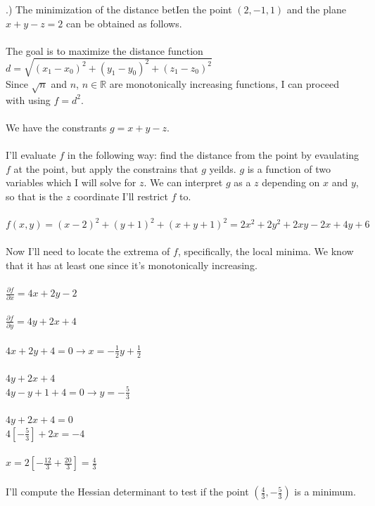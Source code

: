 \documentclass[12pt]{article}
\begin{document}
.) The minimization of the distance betIen the point $(2, -1, 1)$ and the plane $x+y-z = 2$ can be obtained as follows.\\\\
\noindent The goal is to maximize the distance function $d = \sqrt{(x_{1} - x_{0})^{2} + (y_{1} - y_{0})^{2} + (z_{1} - z_{0})^{2}}$\\
\noindent Since $\sqrt{n}$ and $n$, $n \in \mathbb{R}$ are monotonically increasing functions, I can proceed with using $f = d^{2}$.\\\\
\noindent We have the constrants $g = x+y-z$.\\\\
\noindent I'll evaluate $f$ in the following way: find the distance from the point by evaulating $f$ at the point, but apply the constrains 
that $g$ yeilds. $g$ is a function of two variables which I will solve for $z$. We can interpret $g$ as a $z$ depending on $x$ and $y$, so 
that is the $z$ coordinate I'll restrict $f$ to.\\\\
\noindent $f(x,y) = (x-2)^{2} + (y+1)^{2} + (x + y +1)^{2} = 2x^{2}+2y^{2}+2xy-2x+4y+6$\\\\
\noindent Now I'll need to locate the extrema of $f$, specifically, the local minima. We know that it has at least one since it's monotonically increasing. \\\\
\noindent $\frac{\partial f}{\partial x} = 4x+2y-2$\\\\
\noindent $\frac{\partial f}{\partial y} = 4y+2x + 4$\\\\
\noindent $4x+2y+4 = 0 \rightarrow x = -\frac{1}{2}y+\frac{1}{2}$\\\\
\noindent $4y+2x + 4$\\
\noindent $4y -y + 1 +4 = 0 \rightarrow y = -\frac{5}{3}$\\\\
\noindent $4y+2x+4 = 0$\\
\noindent $4[-\frac{5}{3}] + 2x = -4$\\\\
\noindent $x = 2[-\frac{12}{3} + \frac{20}{3}] = \frac{4}{3}$\\\\
\noindent I'll compute the Hessian determinant to test if the point $(\frac{4}{3}, -\frac{5}{3})$ is a minimum.\\
\end{document}
